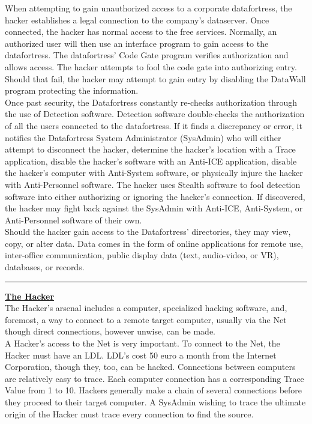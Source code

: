 \documentclass[11pt,twoside,a4paper]{article}
\begin{document}
\begin{multicols*}{2}
When attempting to gain unauthorized access to a corporate datafortress, the hacker establishes a legal connection to the company's dataserver. Once connected, the hacker has normal access to the free services. Normally, an authorized user will then use an interface program to gain access to the datafortress. The datafortress' Code Gate program verifies authorization and allows access. The hacker attempts to fool the code gate into authorizing entry. Should that fail, the hacker may attempt to gain entry by disabling the DataWall program protecting the information. ~\\

Once past security, the Datafortress constantly re-checks authorization through the use of Detection software. Detection software double-checks the authorization of all the users connected to the datafortress. If it finds a discrepancy or error, it notifies the Datafortress System Administrator (SysAdmin) who will either attempt to disconnect the hacker, determine the hacker's location with a Trace application, disable the hacker's software with an Anti-ICE application, disable the hacker's computer with Anti-System software, or physically injure the hacker with Anti-Personnel software. The hacker uses Stealth software to fool detection software into either authorizing or ignoring the hacker's connection. If discovered, the hacker may fight back against the SysAdmin with Anti-ICE, Anti-System, or Anti-Personnel software of their own. ~\\

Should the hacker gain access to the Datafortress' directories, they may view, copy, or alter data. Data comes in the form of online applications for remote use, inter-office communication, public display data (text, audio-video, or VR), databases, or records. ~\\

\begin{center} \rule{0.45\textwidth}{0.01cm} \end{center}

\textbf{\underline{\large The Hacker}}~\\

The Hacker's arsenal includes a computer, specialized hacking software, and, foremost, a way to connect to a remote target computer, usually via the Net though direct connections, however unwise, can be made. ~\\

A Hacker's access to the Net is very important. To connect to the Net, the Hacker must have an LDL. LDL's cost 50 euro a month from the Internet Corporation, though they, too, can be hacked. Connections between computers are relatively easy to trace. Each computer connection has a corresponding Trace Value from 1 to 10. Hackers generally make a chain of several connections before they proceed to their target computer. A SysAdmin wishing to trace the ultimate origin of the Hacker must trace every connection to find the source. ~\\


\end{multicols*}
\end{document}
